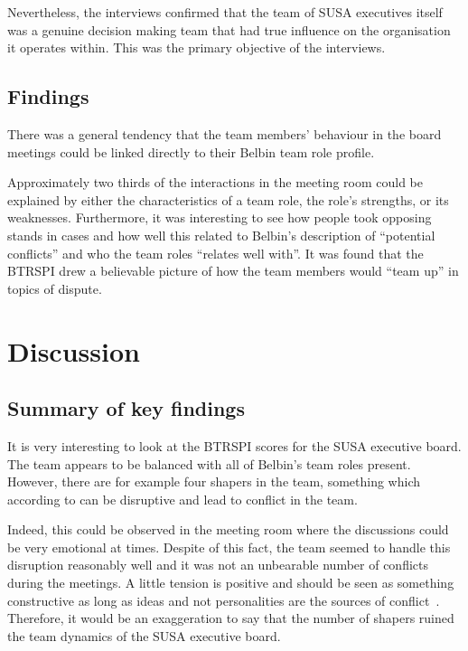 \documentclass[a4paper,12pt,titlepage]{report}
\begin{document}
  Nevertheless, the interviews confirmed that the team of SUSA executives itself
  was a genuine decision making team that had
  true influence on the organisation it operates within. This was the primary
  objective of the interviews.

  \section{Findings \label{findings}}
  There was a general tendency that the team members' behaviour in
  the board meetings could be linked directly to their Belbin team role
  profile.

  Approximately two thirds of the interactions in
  the meeting room could be explained by either the characteristics of a team role,
  the role's strengths, or its weaknesses. Furthermore, it was interesting to
  see how people took opposing stands in cases and how well this related to
  Belbin's description of ``potential conflicts'' and who the team
  roles ``relates well with''. It was found that the BTRSPI 
  drew a believable picture of how the team members would ``team up''
  in topics of dispute.

  \chapter{Discussion}
  \section{Summary of key findings}
  It is very interesting to look at the BTRSPI scores for the SUSA executive board.
  The team appears to be balanced with all of
  Belbin's team roles present. However, there are for example four shapers in
  the team, something which according to \citet{jpns} can be disruptive and lead
  to conflict in the team.

  Indeed, this could be observed in the meeting room where
  the discussions could be very emotional at times.
  Despite of this fact, the team seemed to handle this disruption reasonably well
  and it was not an unbearable number of conflicts during the meetings. A little
  tension is positive and should be seen as something constructive
  as long as ideas and not personalities are the sources of
  conflict~\citep{cg}. Therefore, it would be an exaggeration to say that the number
  of shapers ruined the team dynamics of the SUSA executive board.
\end{document}
